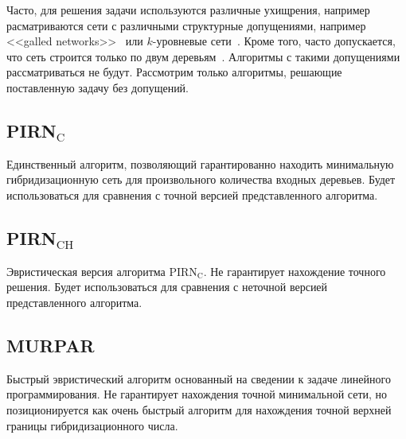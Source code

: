 Часто, для решения задачи используются различные ухищрения, например расматриваются сети с различными структурные допущениями, например <<galled networks>>~\cite{huson2007beyond} или $k$-уровневые сети~\cite{van2009constructing}. Кроме того, часто допускается, что сеть строится только по двум деревьям~\cite{albrecht2012fast, wu2010fast}. Алгоритмы с такими допущениями рассматриваться не будут. Рассмотрим только алгоритмы, решающие поставленную задачу без допущений.

\subsection{PIRN$_\mathrm{C}$}

Единственный алгоритм, позволяющий гарантированно находить минимальную гибридизационную сеть для произвольного количества входных деревьев.
Будет использоваться для сравнения с точной версией представленного алгоритма.

\subsection{PIRN$_\mathrm{CH}$}

Эвристическая версия алгоритма PIRN$_\mathrm{C}$.
Не гарантирует нахождение точного решения.
Будет использоваться для сравнения с неточной версией представленного алгоритма.

\subsection{MURPAR}

Быстрый эвристический алгоритм основанный на сведении к задаче линейного программирования.
Не гарантирует нахождения точной минимальной сети, но позиционируется как очень быстрый алгоритм для нахождения точной верхней границы гибридизационного числа.
